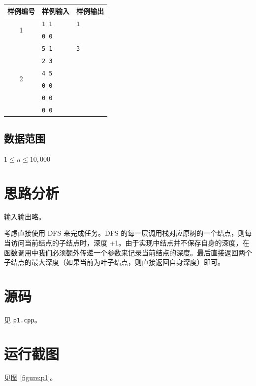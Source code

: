 \documentclass[no-math]{ctexrep}
\begin{document}
    \begin{tabular}{|c|l|l|}
        \hline
        样例编号 & 样例输入 & 样例输出 \\ \hline
        \multirow{2}{*}{1} & \texttt{1 1} & \texttt{1} \\
         & \texttt{0 0} & \\ \hline
        \multirow{6}{*}{2} & \texttt{5 1} & \texttt{3} \\
         & \texttt{2 3} & \\
         & \texttt{4 5} & \\
         & \texttt{0 0} & \\
         & \texttt{0 0} & \\
         & \texttt{0 0} & \\ \hline
    \end{tabular}

    \subsection{数据范围}

    $1 \le n \le 10,\!000$

    \section{思路分析}

    输入输出略。

    考虑直接使用 DFS 来完成任务。DFS 的每一层调用栈对应原树的一个结点，则每当访问当前结点的子结点时，深度 +1。由于实现中结点并不保存自身的深度，在函数调用中我们必须额外传递一个参数来记录当前结点的深度。最后直接返回两个子结点的最大深度（如果当前为叶子结点，则直接返回自身深度）即可。

    \section{源码}

    见 \texttt{p1.cpp}。

    \section{运行截图}

    见图 \ref{figure:p1}。
\end{document}
